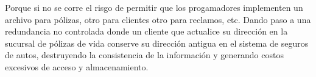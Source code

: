 Porque si no se corre el risgo de permitir que los progamadores implementen un archivo para pólizas, otro para clientes otro para reclamos, etc. Dando paso a una redundancia no controlada donde un cliente que actualice su dirección en la sucursal de pólizas de vida conserve su dirección antigua en el sistema de seguros de autos, destruyendo la consistencia de la información y generando costos excesivos de acceso y almacenamiento.
